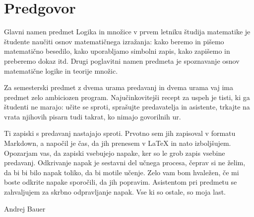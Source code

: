 \chapter{Predgovor}
\label{chap:predgovor}

Glavni namen predmet Logika in množice v prvem letniku študija matematike je študente
naučiti osnov matematičnega izražanja: kako beremo in pišemo matematično besedilo, kako
uporabljamo simbolni zapis, kako zapišemo in preberemo dokaz itd. Drugi poglavitni namen
predmeta je spoznavanje osnov matematične logike in teorije množic.

Za semesterski predmet z dvema urama predavanj in dvema urama vaj ima predmet zelo
ambiciozen program. Najučinkovitejši recept za uspeh je tisti, ki ga študenti ne marajo:
učite se sproti, sprašujte predavatelja in asistente, trkajte na vrata njihovih pisarn
tudi takrat, ko nimajo govorilnih ur.

Ti zapiski s predavanj nastajajo sproti. Prvotno sem jih zapisoval v formatu Markdown, a napočil je čas, da jih prenesem v {\LaTeX} in nato izboljšujem. Opozarjam vas, da zapiski vsebujejo napake, ker so le grob zapis vsebine predavanj. Odkrivanje napak je sestavni del učnega procesa, čeprav si ne želim, da bi bi bilo napak toliko, da bi motile učenje. Zelo vam bom hvaležen, če mi boste odkrite napake sporočili, da jih popravim. Asistentom pri predmetu se zahvaljujem za skrbno odpravljanje napak. Vse ki so ostale, so moja last.


\bigskip

\begin{flushright}
Andrej Bauer \qquad\hbox{}
\end{flushright}

